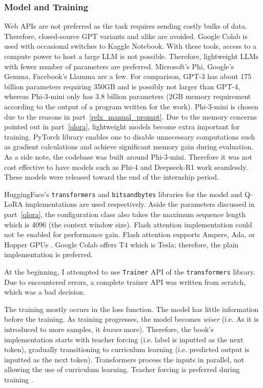 \documentclass{article}
\begin{document}
\subsubsection{Model and Training}
Web APIs are not preferred as the task requires sending costly bulks of data. Therefore, closed-source GPT variants and alike are avoided. Google Colab is used with occasional switches to Kaggle Notebook. With these tools, access to a compute power to host a large LLM is not possible. Therefore, lightweight LLMs with fewer number of parameters are preferred. Microsoft's Phi, Google's Gemma, Facebook's Llamma are a few. For comparison, GPT-3 has about 175 billion parameters requiring 350GB \cite{brown_language_2020} and is possibly not larger than GPT-4, whereas Phi-3-mini only has 3.8 billion parameters \cite{abdin_phi-3_2024} (2GB memory requirement according to the output of a program written for the work). Phi-3-mini is chosen due to the reasons in part~\ref{relx_manual_prompt}. Due to the memory concerns pointed out in part~\ref{qlora}, lightweight models become extra important for training. PyTorch library enables one to disable unnecessary computations such as gradient calculations and achieve significant memory gain during evaluation. As a side note, the codebase was built around Phi-3-mini. Therefore it was not cost effective to have models such as Phi-4 and Deepseek-R1 work seamlessly. These models were released toward the end of the internship period. 

HuggingFace's \texttt{transformers} and \texttt{bitsandbytes} libraries for the model and Q-LoRA implementations are used respectively. Aside the parameters discussed in part~\ref{qlora}, the configuration class also takes the maximum sequence length which is 4096 (the context window size). Flash attention implementation could not be enabled for performance gain. Flash attention supports Ampere, Ada, or Hopper GPUs \cite{dao-ailab_github_2022}. Google Colab offers T4 which is Tesla; therefore, the plain implementation is preferred.

At the beginning, I attempted to use \texttt{Trainer} API of the \texttt{transformers} library. Due to encountered errors, a complete trainer API was written from scratch, which was a bad decision.

The training mostly occurs in the loss function. The model has little information before the training. As training progresses, the model becomes \textit{wiser} (i.e. As it is introduced to more samples, it \textit{knows} more). Therefore, the book's implementation starts with teacher forcing (i.e. label is inputted as the next token), gradually transitioning to curriculum learning (i.e. predicted output is inputted as the next token). Transformers process the inputs in parallel, not allowing the use of curriculum learning. Teacher forcing is preferred during training \cite{lapan_deep_2020}.
\end{document}
